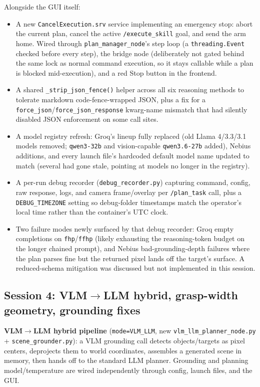 Alongside the GUI itself:
\begin{itemize}[nosep]
  \item A new \texttt{CancelExecution.srv} service implementing an emergency
    stop: abort the current plan, cancel the active
    \texttt{/execute\_skill} goal, and send the arm home. Wired through
    \texttt{plan\_manager\_node}'s step loop (a \texttt{threading.Event}
    checked before every step), the bridge node (deliberately not gated
    behind the same lock as normal command execution, so it stays callable
    while a plan is blocked mid-execution), and a red Stop button in the
    frontend.
  \item A shared \texttt{\_strip\_json\_fence()} helper across all six
    reasoning methods to tolerate markdown code-fence-wrapped JSON, plus a
    fix for a \texttt{force\_json}/\texttt{force\_json\_response} kwarg-name
    mismatch that had silently disabled JSON enforcement on some call sites.
  \item A model registry refresh: Groq's lineup fully replaced (old Llama
    4/3.3/3.1 models removed; \texttt{qwen3-32b} and vision-capable
    \texttt{qwen3.6-27b} added), Nebius additions, and every launch file's
    hardcoded default model name updated to match (several had gone stale,
    pointing at models no longer in the registry).
  \item A per-run debug recorder (\texttt{debug\_recorder.py}) capturing
    command, config, raw response, logs, and camera frame/overlay per
    \texttt{/plan\_task} call, plus a \texttt{DEBUG\_TIMEZONE} setting so
    debug-folder timestamps match the operator's local time rather than the
    container's UTC clock.
  \item Two failure modes newly surfaced by that debug recorder: Groq empty
    completions on \texttt{fhp}/\texttt{ffhp} (likely exhausting the
    reasoning-token budget on the longer chained prompt), and Nebius
    bad-grounding-depth failures where the plan parses fine but the returned
    pixel lands off the target's surface. A reduced-schema mitigation was
    discussed but not implemented in this session.
\end{itemize}

\subsection{Session 4: VLM$\to$LLM hybrid, grasp-width geometry, grounding fixes}

\textbf{VLM$\to$LLM hybrid pipeline} (\texttt{mode=VLM\_LLM}, new
\texttt{vlm\_llm\_planner\_node.py} + \texttt{scene\_grounder.py}): a VLM
grounding call detects objects/targets as pixel centers, deprojects them to
world coordinates, assembles a generated scene in memory, then hands off to
the standard LLM planner. Grounding and planning model/temperature are wired
independently through config, launch files, and the GUI.

